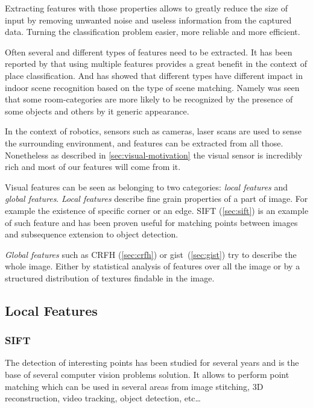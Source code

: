 Extracting features with those properties allows to greatly reduce the size of
input by removing unwanted noise and useless information from the captured data.
Turning the classification problem easier, more reliable and more efficient.

Often several and different types of features need to be extracted. It has been
reported by \cite{pronobis2010ijrr} that using multiple features provides a
great benefit in the context of place classification.
And \cite{quattoni2009recognizing} has showed that different types have
different impact in indoor scene recognition based on the type of scene
matching. Namely was seen that some room-categories are more likely to be
recognized by the presence of some objects and others by it generic appearance.

In the context of robotics, sensors such as cameras, laser scans are used to
sense the surrounding environment, and features can be extracted from all those.
Nonetheless as described in \autoref{sec:visual-motivation} the visual sensor is
incredibly rich and most of our features will come from it.

Visual features can be seen as belonging to two categories:
\emph{local features} and \emph{global features}.
\emph{Local features} describe fine grain properties of a part of image.
For example the existence of specific corner or an edge. \Gls{SIFT}
(\autoref{sec:sift}) is an example of such feature and has been proven useful
for matching points between images and subsequence extension to object detection.

\emph{Global features} such as \gls{CRFH} (\autoref{sec:crfh}) or
{gist}~(\autoref{sec:gist}) try to describe the whole image. Either by
statistical analysis of features over all the image or by a structured
distribution of textures findable in the image.

\subsection{Local Features}
\label{sec:local-features}

\subsubsection{SIFT}
\label{sec:sift}
The detection of interesting points has been studied for several years and is
the base of several computer vision problems solution. It allows to perform
point matching which can be used in several areas from image stitching,
3D reconstruction, video tracking, object detection, etc\dots

